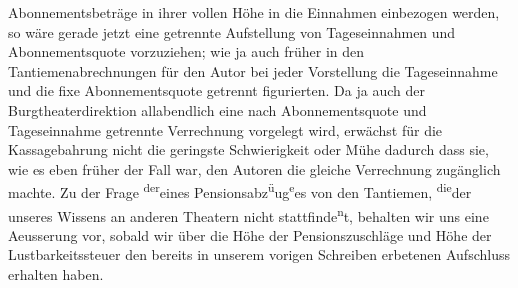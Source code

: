 \begin{ledgroupsized}[t]{13cm}
               Abonnementsbeträge in ihrer vollen Höhe in die Einnahmen einbezogen werden, so wäre
               gerade jetzt eine getrennte Aufstellung von Tageseinnahmen und Abonnementsquote
               vorzuziehen; wie ja auch früher in den Tantiemenabrechnungen für den Autor bei jeder
               Vorstellung die Tageseinnahme und die fixe Abonnementsquote getrennt figurierten.\pend
           \pstart
           Da ja auch der Burgtheaterdirektion allabendlich
               eine nach Abonnementsquote und Tageseinnahme getrennte Verrechnung vorgelegt wird,
               erwächst für die Kassagebahrung nicht die geringste Schwierigkeit oder Mühe dadurch
               dass sie, wie es eben früher der Fall war, den Autoren die gleiche Verrechnung zu{\pb}gänglich machte.\pend
           \pstart
           Zu der Frage \substVorne{}\textsuperscript{der}\substDazwischen{}eines\substHinten{} Pensionsabz\substVorne{}\textsuperscript{ü}\substDazwischen{}u\substHinten{}g\substVorne{}\textsuperscript{e}\substDazwischen{}es\substHinten{} von den Tantiemen, \substVorne{}\textsuperscript{die}\substDazwischen{}der\substHinten{} unseres Wissens an anderen Theatern  nicht stattfinde\substVorne{}\textsuperscript{n}\substDazwischen{}t\substHinten{}, behalten wir uns eine Aeusserung vor, sobald wir über die Höhe der
               Pensionszuschläge und Höhe der Lustbarkeitssteuer den bereits in unserem vorigen
               Schreiben erbetenen Aufschluss erhalten haben.\pend
           
         
         \endnumbering{}\end{ledgroupsized}  \newcommand{\dateiname}{L02409}\newcommand{\titel}{Arthur Schnitzler an Richard Beer-Hofmann, 21. 1. 1924}\newcommand{\editorInnen}{Martin Anton Müller und Gerd-Hermann Susen}
      